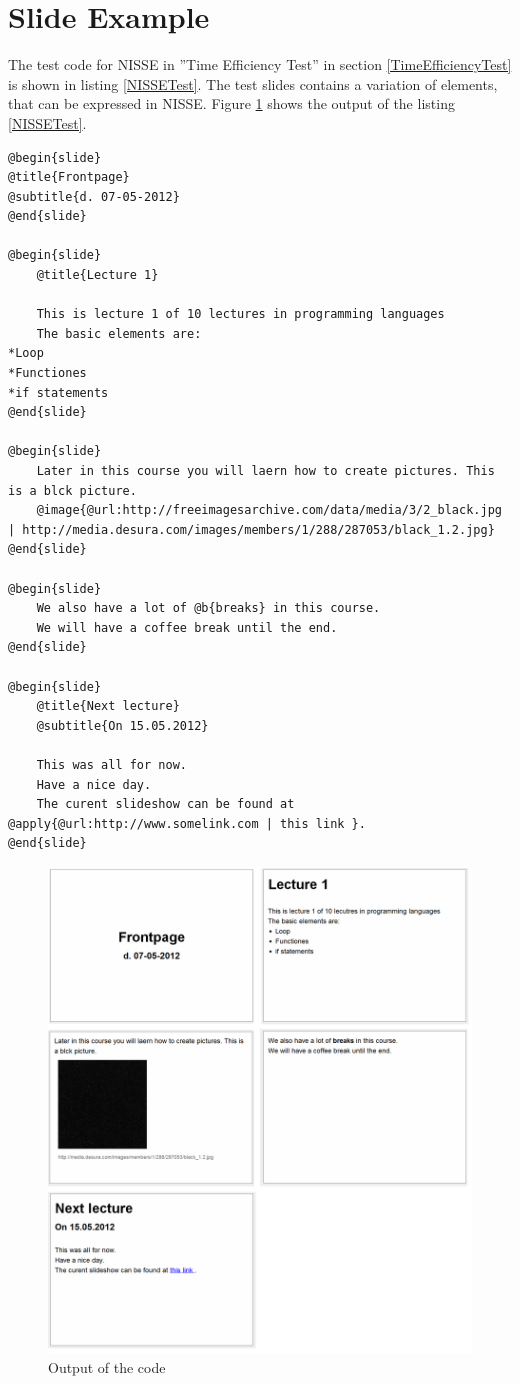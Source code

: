 \section{Slide Example}
\label{ASlideExample}
The test code for NISSE in ''Time Efficiency Test'' in section \ref{TimeEfficiencyTest} is shown in listing \ref{NISSETest}.
The test slides contains a variation of elements, that can be expressed in NISSE.
Figure \ref{fig:EfficiencyTest} shows the output of the listing \ref{NISSETest}.

\begin{lstlisting}[frame=single,caption=Time Efficiency Test code for NISSE, label=NISSETest]
@begin{slide}
@title{Frontpage}
@subtitle{d. 07-05-2012}
@end{slide}

@begin{slide}
    @title{Lecture 1}
    
    This is lecture 1 of 10 lectures in programming languages
    The basic elements are:
*Loop
*Functiones
*if statements
@end{slide}

@begin{slide}
    Later in this course you will laern how to create pictures. This is a blck picture.
    @image{@url:http://freeimagesarchive.com/data/media/3/2_black.jpg | http://media.desura.com/images/members/1/288/287053/black_1.2.jpg}
@end{slide}

@begin{slide}
    We also have a lot of @b{breaks} in this course.
    We will have a coffee break until the end.
@end{slide}

@begin{slide}
    @title{Next lecture}
    @subtitle{On 15.05.2012}
    
    This was all for now.
    Have a nice day.
    The curent slideshow can be found at @apply{@url:http://www.somelink.com | this link }.
@end{slide}

\end{lstlisting}


\begin{figure}[htbp]
	\centering
		\includegraphics[width=1.00\textwidth]{./images/EfficiencyTest.png}
	\caption{Output of the code}
	\label{fig:EfficiencyTest}
\end{figure}

